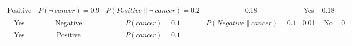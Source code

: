 \documentclass[]{book}
\begin{document}
\begin{longtable}[]{@{}ccccccc@{}}
\begin{minipage}[t]{0.04\columnwidth}
Positive\strut
\end{minipage} & \begin{minipage}[t]{0.04\columnwidth}\centering\strut
\(P(\neg \ cancer) = 0.9\)\strut
\end{minipage} & \begin{minipage}[t]{0.04\columnwidth}\centering\strut
\(P(Positive\|\neg \ cancer) = 0.2\)\strut
\end{minipage} & \begin{minipage}[t]{0.04\columnwidth}\centering\strut
0.18\strut
\end{minipage} & \begin{minipage}[t]{0.04\columnwidth}\centering\strut
Yes\strut
\end{minipage} & \begin{minipage}[t]{0.04\columnwidth}\centering\strut
0.18\strut
\end{minipage}\tabularnewline
\begin{minipage}[t]{0.04\columnwidth}\centering\strut
Yes\strut
\end{minipage} & \begin{minipage}[t]{0.04\columnwidth}\centering\strut
Negative\strut
\end{minipage} & \begin{minipage}[t]{0.04\columnwidth}\centering\strut
\(P(cancer) = 0.1\)\strut
\end{minipage} & \begin{minipage}[t]{0.04\columnwidth}\centering\strut
\(P(Negative\| cancer) = 0.1\)\strut
\end{minipage} & \begin{minipage}[t]{0.04\columnwidth}\centering\strut
0.01\strut
\end{minipage} & \begin{minipage}[t]{0.04\columnwidth}\centering\strut
No\strut
\end{minipage} & \begin{minipage}[t]{0.04\columnwidth}\centering\strut
0\strut
\end{minipage}\tabularnewline
\begin{minipage}[t]{0.04\columnwidth}\centering\strut
Yes\strut
\end{minipage} & \begin{minipage}[t]{0.04\columnwidth}\centering\strut
Positive\strut
\end{minipage} & \begin{minipage}[t]{0.04\columnwidth}\centering\strut
\(P(cancer) = 0.1\)\strut
\end{minipage} & \begin{minipage}[t]{0.04\columnwidth}\centering\strut

\end{minipage}
\end{longtable}
\end{document}
